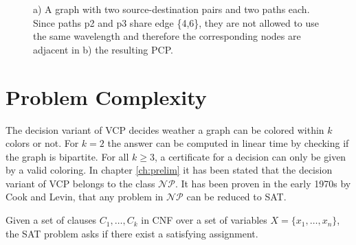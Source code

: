 \begin{center}
\begin{figure}

\caption{a) A graph with two source-destination pairs and two paths each. Since paths p2 and p3 share edge \{4,6\}, they are not allowed to use the same wavelength and therefore the corresponding nodes are adjacent in b) the resulting PCP.}
\label{pd:transformation}
\end{figure}
\end{center}


\section{Problem Complexity}

The decision variant of VCP decides weather a graph can be colored within $k$ colors or not. For $k=2$ the answer can be computed in linear time by checking if the graph is bipartite. For all $k\geq 3$, a certificate for a decision can only be given by a valid coloring. In chapter \ref{ch:prelim} it has been stated that the decision variant of VCP belongs to the class $\mathcal{NP}$. It has been proven in the early 1970s by Cook and Levin, that any problem in $\mathcal{NP}$ can be reduced to SAT. 

\begin{definition}[SAT]
Given a set of clauses $C_1, \ldots , C_k$ in CNF over a set of variables $X = \{x_1,\ldots,x_n\}$, the SAT problem asks if there exist a satisfying assignment.
\end{definition}

